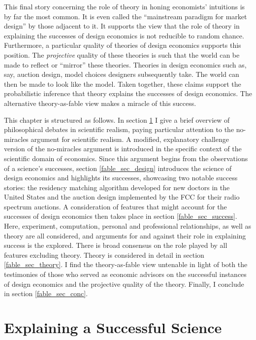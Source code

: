 This final story concerning the role of theory in honing economists' intuitions is by far the most common. It is even called the ``mainstream paradigm for market design'' \autocite[10]{sönmez2023minimalist} by those adjacent to it. It supports the view that the role of theory in explaining the successes of design economics is not reducible to random chance. Furthermore, a particular quality of theories of design economics supports this position. The \textit{projective} quality of these theories is such that the world can be made to reflect or ``mirror'' \autocite{guala2001} these theories. Theories in design economics such as, say, auction design, model choices designers subsequently take. The world can then be made to look like the model. Taken together, these claims support the probabilistic inference that theory explains the successes of design economics. The alternative theory-as-fable view makes a miracle of this success.

This chapter is structured as follows. In section \ref{fable_sec_explain} I give a brief overview of philosophical debates in scientific realism, paying particular attention to the no-miracles argument for scientific realism. A modified, explanatory challenge version of the no-miracles argument is introduced in the specific context of the scientific domain of economics. Since this argument begins from the observations of a science's successes, section \ref{fable_sec_design} introduces the science of design economics and highlights its successes, showcasing two notable success stories: the residency matching algorithm developed for new doctors in the United States and the auction design implemented by the FCC for their radio spectrum auctions. A consideration of features that might account for the successes of design economics then takes place in section \ref{fable_sec_success}. Here, experiment, computation, personal and professional relationships, as well as theory are all considered, and arguments for and against their role in explaining success is the explored. There is broad consensus on the role played by all features excluding theory. Theory is considered in detail in section \ref{fable_sec_theory}. I find the theory-as-fable view untenable in light of both the testimonies of those who served as economic advisors on the successful instances of design economics and the projective quality of the theory. Finally, I conclude in section \ref{fable_sec_conc}.





\section{Explaining a Successful Science}\label{fable_sec_explain}

